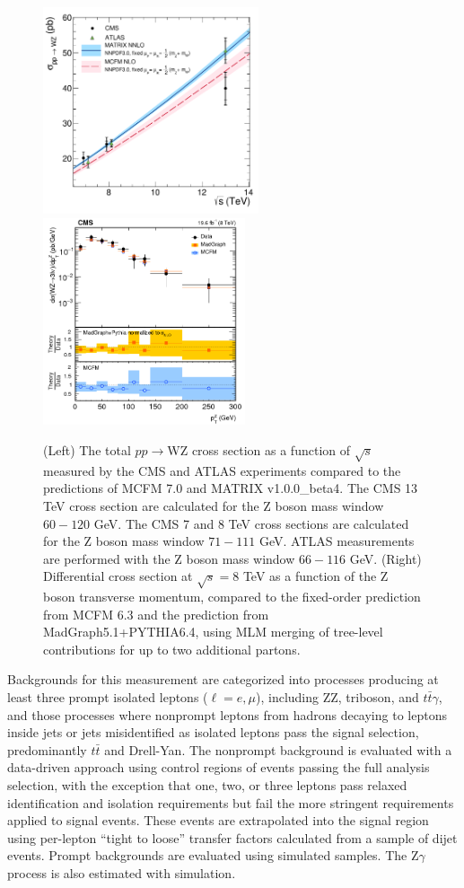 \documentclass[10pt]{article}
\begin{document}
\begin{figure}[htb]
  \centering
    \includegraphics[height=2.4in]{figures/WZCrossSection_vs_sqrtS.pdf}
    \includegraphics[height=2.4in]{figures/WZ8TeV_ptZ_unfolded.png}
    \caption{ (Left) The total $pp \rightarrow $WZ cross section
      as a function of $\sqrt{s}$ measured by the CMS and 
      ATLAS experiments compared to the predictions of \textsc{MCFM} 7.0 and \textsc{MATRIX} v1.0.0\_beta4. 
      The CMS 13 TeV cross section are calculated for the Z boson mass window $60 - 120$ GeV. 
      The CMS 7 and 8  TeV  cross sections are calculated for the Z boson mass window $71 - 111$ GeV.
      ATLAS measurements are performed with the Z boson mass window $66 - 116$  GeV.
      (Right) Differential cross section at $\sqrt{s} = 8$ TeV as a function
      of the Z boson transverse momentum, compared to
      the fixed-order prediction from \textsc{MCFM} 6.3 and the prediction from
      MadGraph5.1+\textsc{PYTHIA}6.4, using MLM merging of tree-level contributions 
      for up to two additional partons.
      }
  \label{fig:WZfigs}
\end{figure}

Backgrounds for this measurement are categorized into processes producing at least
three prompt isolated leptons ($\ell = e, \mu$), including ZZ, triboson, and 
$t\bar{t}\gamma$, and those processes where nonprompt
leptons from hadrons decaying to leptons inside jets or jets misidentified as isolated
leptons pass the signal selection, predominantly $t\bar{t}$ and Drell-Yan. 
The nonprompt background is evaluated with a data-driven approach using 
control regions of events passing the full analysis selection,
with the exception that one, two, or three leptons pass relaxed identification 
and isolation requirements but fail the more stringent requirements applied to signal events.
These events are extrapolated into the signal region using per-lepton 
``tight to loose'' transfer factors
calculated from a sample of dijet events. Prompt backgrounds are evaluated using 
simulated samples. The Z$\gamma$ process is also estimated with simulation.
\end{document}

